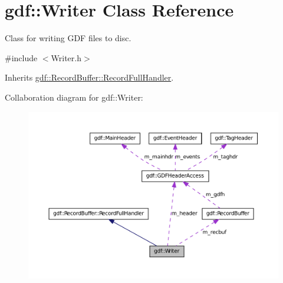 \hypertarget{classgdf_1_1_writer}{
\section{gdf::Writer Class Reference}
\label{classgdf_1_1_writer}
}


Class for writing GDF files to disc.  




{\ttfamily \#include $<$Writer.h$>$}



Inherits \hyperlink{classgdf_1_1_record_buffer_1_1_record_full_handler}{gdf::RecordBuffer::RecordFullHandler}.



Collaboration diagram for gdf::Writer:
\nopagebreak
\begin{figure}[H]
\begin{center}
\leavevmode
\includegraphics[width=400pt]{classgdf_1_1_writer__coll__graph}
\end{center}
\end{figure}
